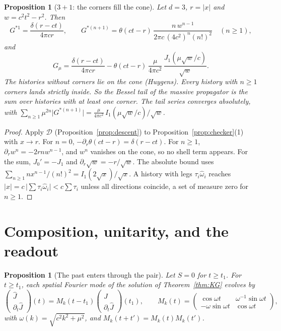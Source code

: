 \documentclass[11pt]{amsart}
\newtheorem{proposition}[theorem]{Proposition}
\theoremstyle{definition}
\theoremstyle{remark}
\newcommand{\Desc}{\mathcal D}
\begin{document}
\begin{proposition}[$3+1$: the corners fill the cone]\label{prop:descent3}
Let $d=3$, $r=\lvert x\rvert$ and $w=c^2t^2-r^2$. Then
\[
G^{*1}=\frac{\delta(r-ct)}{4\pi cr},\qquad G^{*(n+1)}=\theta(ct-r)\,\frac{n\,w^{n-1}}{2\pi c\,(4c^2)^n(n!)^2}\quad(n\ge1),
\]
and
\[
G_\mu=\frac{\delta(r-ct)}{4\pi cr}-\theta(ct-r)\,\frac{\mu}{4\pi c^2}\,\frac{J_1(\mu\sqrt w/c)}{\sqrt w}.
\]
The histories without corners lie on the cone (Huygens). Every history with $n\ge1$ corners lands strictly inside. So the Bessel tail of the massive propagator is the sum over histories with at least one corner. The tail series converges absolutely, with $\sum_{n\ge1}\mu^{2n}\lvert G^{*(n+1)}\rvert=\frac{\mu}{4\pi c^2}\,I_1(\mu\sqrt w/c)/\sqrt w$.
\end{proposition}

\begin{proof}
Apply $\Desc$ (Proposition~\ref{prop:descent}) to Proposition~\ref{prop:checker}(1) with $x\to r$. For $n=0$, $-\partial_r\theta(ct-r)=\delta(r-ct)$. For $n\ge1$, $\partial_rw^n=-2rnw^{n-1}$, and $w^n$ vanishes on the cone, so no shell term appears. For the sum, $J_0'=-J_1$ and $\partial_r\sqrt w=-r/\sqrt w$. The absolute bound uses $\sum_{n\ge1}nx^{n-1}/(n!)^2=I_1(2\sqrt x)/\sqrt x$. A history with legs $\tau_i\hat\omega_i$ reaches $\lvert x\rvert=c\,\lvert\sum\tau_i\hat\omega_i\rvert<c\sum\tau_i$ unless all directions coincide, a set of measure zero for $n\ge1$.
\end{proof}

\section{Composition, unitarity, and the readout}

\begin{proposition}[The past enters through the pair]\label{prop:pair}
Let $S=0$ for $t\ge t_1$. For $t\ge t_1$, each spatial Fourier mode of the solution of Theorem~\ref{thm:KG} evolves by
\[
\begin{pmatrix}\hat J\\ \partial_t\hat J\end{pmatrix}(t)=M_k(t-t_1)\begin{pmatrix}\hat J\\ \partial_t\hat J\end{pmatrix}(t_1),\qquad
M_k(t)=\begin{pmatrix}\cos\omega t&\omega^{-1}\sin\omega t\\ -\omega\sin\omega t&\cos\omega t\end{pmatrix},
\]
with $\omega(k)=\sqrt{c^2k^2+\mu^2}$, and $M_k(t+t')=M_k(t)M_k(t')$.
\end{proposition}
\end{document}
